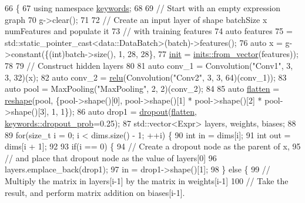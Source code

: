 \begin{DoxyCode}
66                                                      \{
67     \textcolor{keyword}{using namespace }\hyperlink{namespacekeywords}{keywords};
68 
69     \textcolor{comment}{// Start with an empty expression graph}
70     g->clear();
71 
72     \textcolor{comment}{// Create an input layer of shape batchSize x numFeatures and populate it}
73     \textcolor{comment}{// with training features}
74     \textcolor{keyword}{auto} features
75         = std::static\_pointer\_cast<data::DataBatch>(batch)->features();
76     \textcolor{keyword}{auto} x = g->constant(\{(int)batch->size(), 1, 28, 28\},
77                          \hyperlink{amunmt_8cpp_a2e8ddb8bd2f3405f554c9f2c52277f4b}{init} = \hyperlink{namespacemarian_1_1inits_ab9566318ddbacd376c74cdbdfac091e4}{inits::from\_vector}(features));
78 
79     \textcolor{comment}{// Construct hidden layers}
80 
81     \textcolor{keyword}{auto} conv\_1 = Convolution(\textcolor{stringliteral}{"Conv1"}, 3, 3, 32)(x);
82     \textcolor{keyword}{auto} conv\_2 = \hyperlink{namespacemarian_a6228f7e46aeed337e3886df6446b7840}{relu}(Convolution(\textcolor{stringliteral}{"Conv2"}, 3, 3, 64)(conv\_1));
83     \textcolor{keyword}{auto} pool = MaxPooling(\textcolor{stringliteral}{"MaxPooling"}, 2, 2)(conv\_2);
84 
85     \textcolor{keyword}{auto} \hyperlink{namespacemarian_aea8d2acadf0d96f6e455addd57cba80d}{flatten} = \hyperlink{namespacemarian_acd984f43188d0ae23c2a6ef13ae5293f}{reshape}(pool, \{pool->shape()[0], pool->shape()[1] * pool->shape()[2] * 
      pool->shape()[3], 1, 1\});
86     \textcolor{keyword}{auto} drop1 = \hyperlink{namespacemarian_a268400392f22176821c7c4a36733b178}{dropout}(\hyperlink{namespacemarian_aea8d2acadf0d96f6e455addd57cba80d}{flatten}, \hyperlink{namespacemarian_1_1keywords_aeb1a41f81a79487b23aa2f8769a205bf}{keywords::dropout\_prob}=0.25);
87     std::vector<Expr> layers, weights, biases;
88 
89     \textcolor{keywordflow}{for}(\textcolor{keywordtype}{size\_t} i = 0; i < dims.size() - 1; ++i) \{
90       \textcolor{keywordtype}{int} in = dims[i];
91       \textcolor{keywordtype}{int} out = dims[i + 1];
92 
93       \textcolor{keywordflow}{if}(i == 0) \{
94         \textcolor{comment}{// Create a dropout node as the parent of x,}
95         \textcolor{comment}{//   and place that dropout node as the value of layers[0]}
96         layers.emplace\_back(drop1);
97         in = drop1->shape()[1];
98       \} \textcolor{keywordflow}{else} \{
99         \textcolor{comment}{// Multiply the matrix in layers[i-1] by the matrix in weights[i-1]}
100         \textcolor{comment}{// Take the result, and perform matrix addition on biases[i-1].}

\end{DoxyCode}
